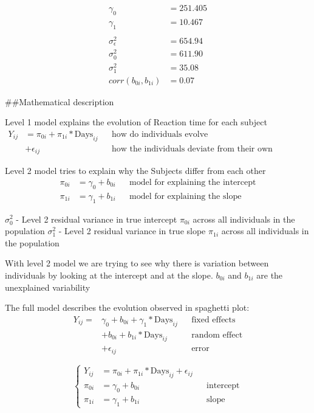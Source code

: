 \documentclass[
]{article}
\begin{document}
\[\begin{align}
\gamma_{0}  &= 251.405 \\
\gamma_{1}  &= 10.467  \\
\\
\sigma_{\epsilon}^{2} &= 654.94 \\
\sigma_{0}^{2} &= 611.90 \\
\sigma_{1}^{2} &= 35.08 \\
corr(b_{0i}, b_{1i}) &= 0.07
\end{align}\]

\#\#Mathematical description

Level 1 model explains the evolution of Reaction time for each subject
\[\begin{align}
Y_{ij}&= \pi_{0i} + \pi_{1i}* \text{Days}_{ij} && \text{how do individuals evolve} \\
          &+ \epsilon_{ij} &&\text{how the individuals deviate from their own evolution}
\end{align}\]

Level 2 model tries to explain why the Subjects differ from each other
\[\begin{align}
\pi_{0i} &= \gamma_{0} + b_{0i} &&\text{model for explaining the intercept} \\
\pi_{1i} &= \gamma_{1} + b_{1i} &&\text{model for explaining the slope}
\end{align}\]

\(\sigma_{0}^{2}\) - Level 2 residual variance in true intercept
\(\pi_{0i}\) across all individuals in the population \(\sigma_{1}^{2}\)
- Level 2 residual variance in true slope \(\pi_{1i}\) across all
individuals in the population

With level 2 model we are trying to see why there is variation between
individuals by looking at the intercept and at the slope. \(b_{0i}\) and
\(b_{1i}\) are the unexplained variability

The full model describes the evolution observed in spaghetti plot:
\[\begin{align}
Y_{ij} =& \gamma_{0} + b_{0i} + \gamma_{1}* \text{Days}_{ij} &&\text{fixed effects}\\
          &+ b_{0i} + b_{1i}*\text{Days}_{ij} &&\text{random effect}\\
          &+ \epsilon_{ij} &&\text{error}
\end{align}\]

\[
\begin{cases}
Y_{ij}&= \pi_{0i} + \pi_{1i}* \text{Days}_{ij} + \epsilon_{ij} \\
\pi_{0i} &= \gamma_{0} + b_{0i} &&\text{intercept} \\
\pi_{1i} &= \gamma_{1} + b_{1i} &&\text{slope}
\end{cases}
\]
\end{document}
